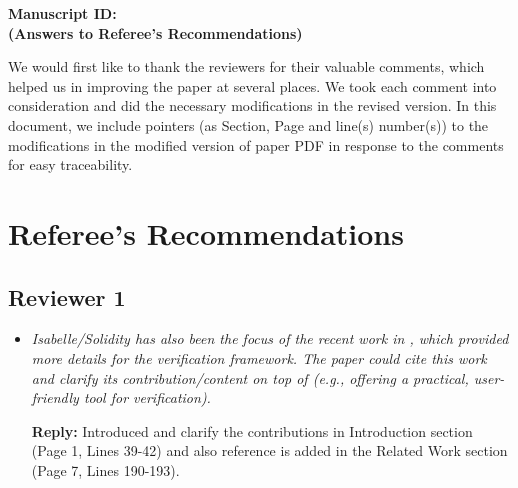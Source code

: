 \documentclass[a4paper, 12pt] {article}
\begin{document}
\begin {center}

\LARGE{\textbf{Manuscript ID:}\\
\large{\textbf{(Answers to Referee's Recommendations)}}}

\end {center}

\vspace {8 mm}

\small {We would first like to thank the reviewers for their
valuable comments, which helped us in improving the paper at several
places. We took each comment into consideration and did the
necessary modifications in the revised version. In this document, 
we
include pointers (as Section, Page and line(s) number(s)) to the modifications in the modified version of paper PDF  in response to the comments for easy traceability. }\\



%
%
%
\section{Referee's Recommendations}

\subsection{Reviewer 1}
\begin{itemize}
  
\item \emph{Isabelle/Solidity has also been the focus of the recent work in \cite{try}, which provided more details for the verification framework. The paper could cite this work and clarify its contribution/content on top of \cite{try} (e.g., offering a practical, user-friendly tool for verification).
}


\textbf{Reply:} Introduced and clarify the contributions in Introduction section (Page 1, Lines 39-42) and also reference is added in the Related Work section (Page 7, Lines 190-193).

\end{itemize}


\newpage
\end{document}
